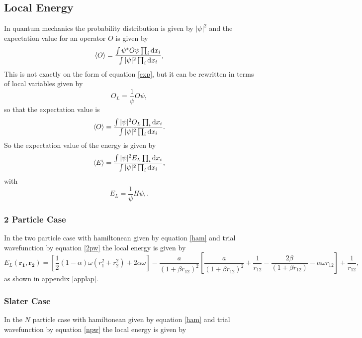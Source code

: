 \documentclass[a4paper,English,10pt]{article}
\newcommand{\bb}[1]{\boldsymbol{#1}}
\newcommand{\dd}{\mathrm{d}}
\newcommand{\be}{\begin{equation}}
\newcommand{\ee}{\end{equation}}
\newcommand{\f}{\frac}
\renewcommand{\braket}{\Braket}
\begin{document}
\subsection{Local Energy}
In quantum mechanics the probability distribution is given by $|\psi|^2$ and the expectation value for an operator $O$ is given by
\be
\braket{O} = \f{\int\psi^*O\psi\prod_i\dd x_i}{\int|\psi|^2\prod_i\dd x_i},
\ee
This is not exactly on the form of equation \ref{exp}, but it can be rewritten in terms of local variables given by
\be
O_L = \f{1}{\psi}O\psi, \label{localdef}
\ee
so that the expectation value is
\be
\braket{O} =  \f{\int|\psi|^2O_L\prod_i\dd x_i}{\int|\psi|^2\prod_i\dd x_i}.
\ee
So the expectation value of the energy is given by
\be
\braket{E} =  \f{\int|\psi|^2E_L\prod_i\dd x_i}{\int|\psi|^2\prod_i\dd x_i},
\ee
with
\be
E_L = \f{1}{\psi}H\psi, \label{localEdef}.
\ee



\subsubsection{2 Particle Case}

In the two particle case with hamiltonean given by equation \ref{ham} and trial wavefunction by equation \ref{2pw} the local energy is given by
\be
E_L(\bb{r_1},\bb{r_2}) = \left[\f{1}{2}(1- \alpha)\omega(r_1^2 + r_2^2) + 2\alpha\omega\right]  - \f{a}{(1+\beta r_{12})^2}\left[\f{a}{(1+\beta r_{12})^2}+  \f{1}{r_{12}} - \f{2\beta}{(1+\beta r_{12})} -\alpha\omega r_{12}\right] + \f{1}{r_{12}},
\ee
as shown in appendix \ref{applap}.

\subsubsection{Slater Case}
In the $N$ particle case with hamiltonean given by equation \ref{ham} and trial wavefunction by equation \ref{npw} the local energy is given by
\end{document}
